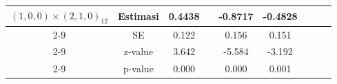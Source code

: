 \begin{enumerate}[label=\alph*.]
\begin{longtable}{|c|c|c|c|c|c|c|c|c|}
            \multirow{4}{*}{$(1,0,0)\times(2,1,0)_{12}$}
            & Estimasi & 0.4438 & {} & -0.8717 & -0.4828 & {} & {} & {}\\ \cline{2-9}
            & SE       & 0.122 & {} & 0.156 & 0.151 & {} & {} & {}\\ \cline{2-9}
            & z-value  & 3.642 & {} & -5.584 & -3.192 & {} & {}& {}\\ \cline{2-9}
            & p-value  & 0.000 & {} & 0.000 & 0.001 & {} & {} & {}\\ \hline
        \end{longtable}
        \normalsize
\end{enumerate}